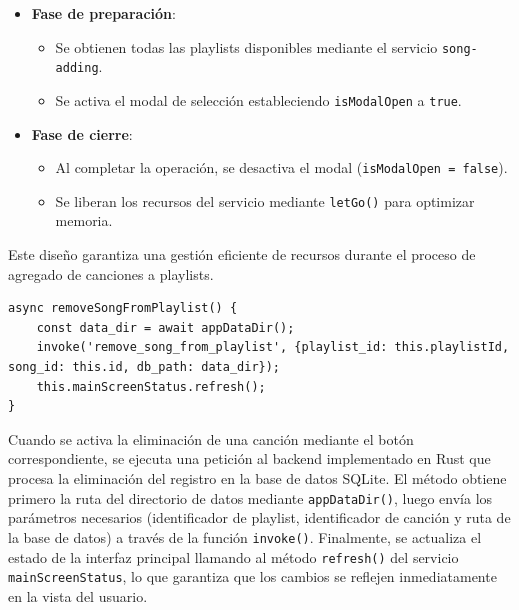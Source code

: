 \documentclass[11pt, a4paper]{article}
\begin{document}
                \begin{itemize}
                    \item \textbf{Fase de preparación}:
                    \begin{itemize}
                        \item Se obtienen todas las playlists disponibles mediante el servicio \texttt{song-adding}.
                        \item Se activa el modal de selección estableciendo \texttt{isModalOpen} a \texttt{true}.
                    \end{itemize}
                    
                    \item \textbf{Fase de cierre}:
                    \begin{itemize}
                        \item Al completar la operación, se desactiva el modal (\texttt{isModalOpen = false}).
                        \item Se liberan los recursos del servicio mediante \texttt{letGo()} para optimizar memoria.
                    \end{itemize}
                \end{itemize}

                Este diseño garantiza una gestión eficiente de recursos durante el proceso de agregado de canciones a playlists. \\

                \begin{lstlisting}[caption={removeSongFromPlaylist()}]
async removeSongFromPlaylist() {
    const data_dir = await appDataDir();
    invoke('remove_song_from_playlist', {playlist_id: this.playlistId, song_id: this.id, db_path: data_dir});
    this.mainScreenStatus.refresh();
}
                \end{lstlisting}

                Cuando se activa la eliminación de una canción mediante el botón correspondiente, se ejecuta una petición al backend implementado en Rust que procesa la eliminación del registro en la base de datos SQLite. El método obtiene primero la ruta del directorio de datos mediante \texttt{appDataDir()}, luego envía los parámetros necesarios (identificador de playlist, identificador de canción y ruta de la base de datos) a través de la función \texttt{invoke()}. Finalmente, se actualiza el estado de la interfaz principal llamando al método \texttt{refresh()} del servicio \texttt{mainScreenStatus}, lo que garantiza que los cambios se reflejen inmediatamente en la vista del usuario.
\end{document}
